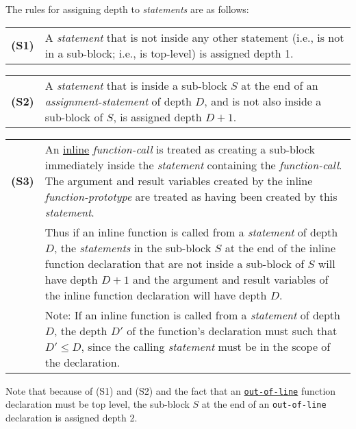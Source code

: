 \documentclass[12pt]{article}
\newcommand{\key}[1]{{\rm \bfseries #1}}
\newenvironment{indpar}[1][0.3in]%
	{\begin{list}{}%
		     {\setlength{\itemsep}{0in}%
		      \setlength{\topsep}{0in}%
		      \setlength{\parsep}{1ex}%
		      \setlength{\labelwidth}{#1}%
		      \setlength{\leftmargin}{#1}%
		      \addtolength{\leftmargin}{\labelsep}}%
	 \item}%
	{\end{list}}
\begin{document}
The rules for assigning depth to {\em statements} are as follows:
\begin{indpar}[0.2in]
\begin{tabular}{p{0.4in}p{5.0in}}
\key{(S1)}	& A {\em statement} that is not inside any other statement
                  (i.e., is not in a sub-block; i.e., is top-level)
		  is assigned depth 1.
\end{tabular}

\begin{tabular}{p{0.4in}p{5.0in}}
\key{(S2)}	& A {\em statement} that is inside a sub-block $S$ at the end
                  of an {\em assignment-statement} of depth $D$, and
		  is not also
		  inside a sub-block of $S$, is assigned depth $D+1$.
\end{tabular}

\begin{tabular}{p{0.4in}p{5.0in}}
\key{(S3)}	& An \underline{inline} {\em function-call} is treated
                  as creating a sub-block immediately inside
		  the {\em statement} containing the {\em function-call}.
		  The argument and result variables created by the inline
		  {\em function-prototype} are treated as having been
		  created by this {\em statement}.
\\[1ex]
		& Thus if an inline function is called from a {\em statement}
		  of depth $D$, the {\em statements} in the sub-block $S$ at the
		  end of the inline function declaration that are not inside
		  a sub-block of $S$ will have depth $D+1$ and the
		  argument and result variables of the inline function
		  declaration will have depth $D$.
\\[1ex]
		& Note: If an inline function is called from a {\em statement}
		  of depth $D$, the depth $D'$ of the function's declaration
		  must such that $D'\leq D$, since the calling {\em statement}
		  must be in the scope of the declaration.
\end{tabular}
\end{indpar}

Note that because of (S1) and (S2) and the fact that an
\underline{\tt out-of-line} function declaration must be top level,
the sub-block $S$ at the end of an {\tt out-of-line}
declaration is assigned depth 2.
\end{document}
